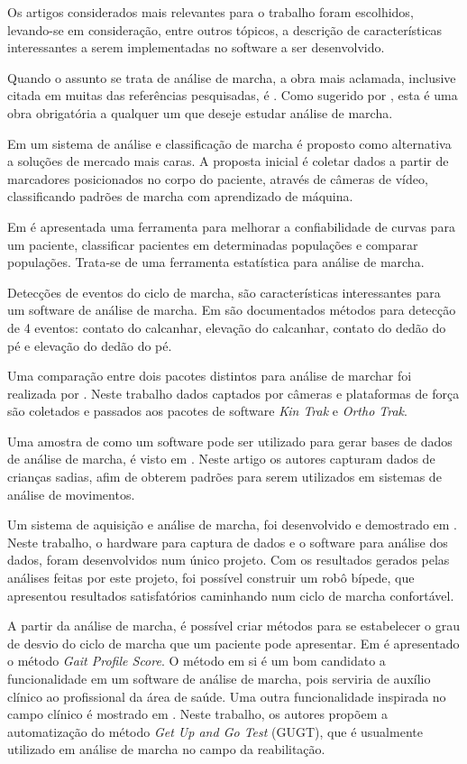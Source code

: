 Os artigos considerados mais relevantes para o trabalho foram escolhidos, levando-se em consideração, entre outros tópicos, a descrição de características interessantes a serem implementadas no software a ser desenvolvido.

Quando o assunto se trata de análise de marcha, a obra mais aclamada, inclusive citada em muitas das referências pesquisadas, é .
Como sugerido por , esta é uma obra obrigatória a qualquer um que deseje estudar análise de marcha.

Em  um sistema de análise e classificação de marcha é proposto como alternativa a soluções de mercado mais caras.
A proposta inicial é coletar dados a partir de marcadores posicionados no corpo do paciente, através de câmeras de vídeo, classificando padrões de marcha com aprendizado de máquina.

Em  é apresentada uma ferramenta para melhorar a confiabilidade de curvas para um paciente, classificar pacientes em determinadas populações e comparar populações.
Trata-se de uma ferramenta estatística para análise de marcha.

Detecções de eventos do ciclo de marcha, são características interessantes para um software de análise de marcha. 
Em  são documentados métodos para detecção de 4 eventos: contato do calcanhar, elevação do calcanhar, contato do dedão do pé e elevação do dedão do pé.

Uma comparação entre dois pacotes distintos para análise de marchar foi realizada por . 
Neste trabalho dados captados por câmeras e plataformas de força são coletados e passados aos pacotes de software \emph{Kin Trak} e \emph{Ortho Trak}.

Uma amostra de como um software pode ser utilizado para gerar bases de dados de análise de marcha, é visto em . Neste artigo os autores capturam dados de crianças sadias, afim de obterem padrões para serem utilizados em sistemas de análise de movimentos.

Um sistema de aquisição e análise de marcha, foi desenvolvido e demostrado em . 
Neste trabalho, o hardware para captura de dados e o software para análise dos dados, foram desenvolvidos num único projeto.
Com os resultados gerados pelas análises feitas por este projeto, foi possível construir um robô bípede, que apresentou resultados satisfatórios caminhando num ciclo de marcha confortável.

A partir da análise de marcha, é possível criar métodos para se estabelecer o grau de desvio do ciclo de marcha que um paciente pode apresentar.
Em  é apresentado o método \emph{Gait Profile Score}.
O método em si é um bom candidato a funcionalidade em um software de análise de marcha, pois serviria de auxílio clínico ao profissional da área de saúde.
Uma outra funcionalidade inspirada no campo clínico é mostrado em . Neste trabalho, os autores 
propõem a automatização do método \emph{Get Up and Go Test} (GUGT), que é usualmente utilizado em análise de marcha no campo da reabilitação.

